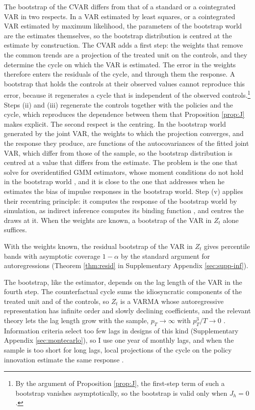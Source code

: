 \documentclass[12pt,a4paper]{article}
\theoremstyle{definition}
\theoremstyle{definition}\newtheorem{example}{Example}
\theoremstyle{definition}\newtheorem{definition}{Definition}
\begin{document}
The bootstrap of the CVAR differs from that of a standard or a cointegrated VAR in two respects. In a VAR estimated by least squares, or a cointegrated VAR estimated by maximum likelihood, the parameters of the bootstrap world are the estimates themselves, so the bootstrap distribution is centred at the estimate by construction. The CVAR adds a first step: the weights that remove the common trends are a projection of the treated unit on the controls, and they determine the cycle on which the VAR is estimated. The error in the weights therefore enters the residuals of the cycle, and through them the response. A bootstrap that holds the controls at their observed values cannot reproduce this error, because it regenerates a cycle that is independent of the observed controls.\footnote{By the argument of Proposition \ref{prop:J}, the first-step term of such a bootstrap vanishes asymptotically, so the bootstrap is valid only when $J_h=0$.} Steps (ii) and (iii) regenerate the controls together with the policies and the cycle, which reproduces the dependence between them that Proposition \ref{prop:J} makes explicit. The second respect is the centring. In the bootstrap world generated by the joint VAR, the weights to which the projection converges, and the response they produce, are functions of the autocovariances of the fitted joint VAR, which differ from those of the sample, so the bootstrap distribution is centred at a value that differs from the estimate. The problem is the one that \citet{HallHorowitz1996} solve for overidentified GMM estimators, whose moment conditions do not hold in the bootstrap world \citep{Horowitz2001}, and it is close to the one that \citet{Kilian1998} addresses when he estimates the bias of impulse responses in the bootstrap world. Step (v) applies their recentring principle: it computes the response of the bootstrap world by simulation, as indirect inference computes its binding function \citep{GourierouxMonfortRenault1993}, and centres the draws at it. When the weights are known, a bootstrap of the VAR in $Z_t$ alone suffices.

With the weights known, the residual bootstrap of the VAR in $Z_t$ gives percentile bands with asymptotic coverage $1-\alpha$ by the standard argument for autoregressions (Theorem \ref{thm:resid} in Supplementary Appendix \ref{sec:supp-inf}).

The bootstrap, like the estimator, depends on the lag length of the VAR in the fourth step. The counterfactual cycle sums the idiosyncratic components of the treated unit and of the controls, so $Z_t$ is a VARMA whose autoregressive representation has infinite order and slowly declining coefficients, and the relevant theory lets the lag length grow with the sample, $p_T\to\infty$ with $p_T^3/T\to0$ \citep{LewisReinsel1985,InoueKilian2002}. Information criteria select too few lags in designs of this kind (Supplementary Appendix \ref{sec:montecarlo}), so I use one year of monthly lags, and when the sample is too short for long lags, local projections of the cycle on the policy innovation estimate the same response \citep{PlagborgMollerWolf2021,LiPlagborgMollerWolf2024}.
\end{document}
